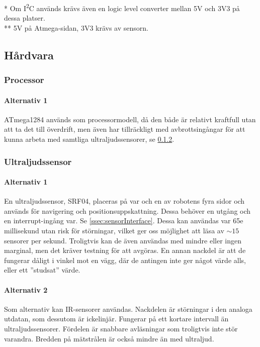 \documentclass[a4paper,11pt]{article}
\begin{document}
\noindent \begin{small}
    * Om I\textsuperscript{2}C används krävs även en logic level converter mellan 5V och 3V3 på dessa platser.\\
    ** 5V på Atmega-sidan, 3V3 krävs av sensorn.
\end{small}
\subsection{Hårdvara}

\subsubsection{Processor} %

\paragraph{Alternativ 1} %
ATmega1284 används som processormodell, då den både är relativt kraftfull utan att ta det till överdrift, men även har tillräckligt med avbrottsingångar för att kunna arbeta med samtliga ultraljudssensorer, se \ref{sssec:sonicsensors}.

\subsubsection{Ultraljudssensor} \label{sssec:sonicsensors}
\paragraph{Alternativ 1}
En ultraljudssensor, SRF04, placeras på var och en av robotens fyra sidor och används för navigering och positionsuppskattning. Dessa behöver en utgång och en interrupt-ingång var. Se \ref{ssec:sensorInterface}. Dessa kan användas var 65e millisekund utan risk för störningar, vilket ger oss möjlighet att läsa av $\sim15$ sensorer per sekund. Troligtvis kan de även användas med mindre eller ingen marginal, men det kräver testning för att avgöras. En annan nackdel är att de fungerar dåligt i vinkel mot en vägg, där de antingen inte ger något värde alls, eller ett ''studsat'' värde. %
%
\paragraph{Alternativ 2}
Som alternativ kan IR-sensorer användas. Nackdelen är störningar i den analoga utdatan, som dessutom är ickelinjär. Fungerar på ett kortare intervall än ultraljudssensorer. Fördelen är snabbare avläsningar som troligtvis inte stör varandra. Bredden på mätstrålen är också mindre än med ultraljud.
\end{document}
